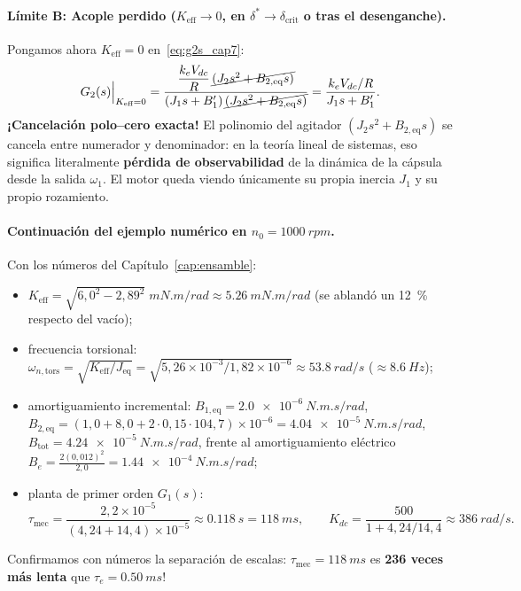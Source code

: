 \documentclass[11pt,a4paper,oneside]{book}
\begin{document}
\paragraph{Límite B: Acople perdido ($K_{\text{eff}} \to 0$, en $\delta^\ast \to \delta_{\text{crit}}$ o tras el desenganche).}
Pongamos ahora $K_{\text{eff}} = 0$ en~\eqref{eq:g2s_cap7}:
\[
  G_2(s)\Big|_{K_{\text{eff}} = 0}
  = \frac{\dfrac{k_e V_{dc}}{R}\,\cancel{(J_2 s^2 + B_{2,\text{eq}} s)}}
         {(J_1 s + B_1')\,\cancel{(J_2 s^2 + B_{2,\text{eq}} s)}}
  = \frac{k_e V_{dc}/R}{J_1 s + B_1'}.
\]
\textbf{¡Cancelación polo--cero exacta!} El polinomio del agitador
$(J_2 s^2 + B_{2,\text{eq}} s)$ se cancela entre numerador y denominador: en la
teoría lineal de sistemas, eso significa literalmente \textbf{pérdida de
observabilidad} de la dinámica de la cápsula desde la salida $\omega_1$. El
motor queda viendo únicamente su propia inercia $J_1$ y su propio rozamiento.

\paragraph{Continuación del ejemplo numérico en $n_0 = \SI{1000}{rpm}$.}
Con los números del Capítulo~\ref{cap:ensamble}:
\begin{itemize}
  \item $K_{\text{eff}} = \sqrt{6{,}0^2 - 2{,}89^2}\;\si{mN.m/rad} \approx \SI{5,26}{mN.m/rad}$
        (se ablandó un \SI{12}{\percent} respecto del vacío);
  \item frecuencia torsional:
        $\omega_{n,\text{tors}} = \sqrt{K_{\text{eff}}/J_{\text{eq}}}
        = \sqrt{5{,}26\times 10^{-3}/1{,}82\times 10^{-6}} \approx \SI{53,8}{rad/s}$ ($\approx \SI{8,6}{Hz}$);
  \item amortiguamiento incremental:
        $B_{1,\text{eq}} = \SI{2,0e-6}{N.m.s/rad}$,
        $B_{2,\text{eq}} = (1{,}0 + 8{,}0 + 2\cdot 0{,}15\cdot 104{,}7)\times 10^{-6} = \SI{4,04e-5}{N.m.s/rad}$,
        $B_{\text{tot}} = \SI{4,24e-5}{N.m.s/rad}$,
        frente al amortiguamiento eléctrico $B_e = \frac{2(0{,}012)^2}{2{,}0} = \SI{1,44e-4}{N.m.s/rad}$;
  \item planta de primer orden $G_1(s)$:
        \[
          \tau_{\text{mec}} = \frac{2{,}2\times 10^{-5}}{(4{,}24 + 14{,}4)\times 10^{-5}}
                            \approx \SI{0,118}{s} = \SI{118}{ms},
          \qquad
          K_{dc} = \frac{500}{1 + 4{,}24/14{,}4} \approx \SI{386}{rad/s}.
        \]
\end{itemize}
Confirmamos con números la separación de escalas: $\tau_{\text{mec}} = \SI{118}{ms}$
es \textbf{236 veces más lenta} que $\tau_e = \SI{0,50}{ms}$!
\end{document}
